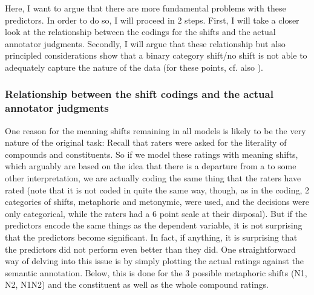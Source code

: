 Here, I want to argue that there are more fundamental problems with
these predictors. In order to do so, I will proceed in 2
steps. First, I will take a closer look at the relationship between
the codings for the shifts and the actual annotator
judgments. Secondly, I will argue that these relationship but also
principled considerations show that a binary category shift/no shift is
not able to adequately capture the nature of the data (for these
points, cf. also \citealt{BellandSchaefer:2016}).





\subsubsection{Relationship between the shift codings and the actual annotator judgments}
\label{sec:rel-codings-shifts}

One reason for the meaning shifts remaining in all models is likely to
be the very nature of the original task: Recall that raters were asked
for the literality of compounds and constituents. So if we model these
ratings with meaning shifts, which arguably are based on the idea that
there is a departure from a  to some other
interpretation, we are actually coding the same thing that the raters
have rated (note that it is not coded in quite the same way, though, as
in the coding, 2 categories of shifts, metaphoric and metonymic,
were used, and the decisions were only categorical, while the raters
had a 6 point scale at their disposal).
But if the predictors encode the same things
as the dependent variable, it is not surprising that the predictors
become significant. In fact, if anything, it is surprising that the
predictors did not perform even better than they did. One
straightforward way of delving into this issue is by simply plotting
the actual ratings against the semantic annotation. Below, this is
done for the 3 possible metaphoric shifts (N1, N2, N1N2) and the
constituent as well as the whole compound ratings.

